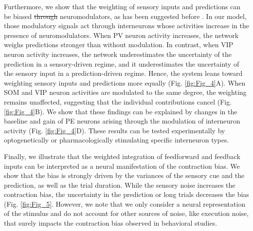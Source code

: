 \documentclass[10pt,a4paper]{article}
\providecommand{\DIFaddtex}[1]{{\protect\color{blue}\uwave{#1}}} %
\providecommand{\DIFdeltex}[1]{{\protect\color{red}\sout{#1}}}                      %
\providecommand{\DIFaddbegin}{} %
\providecommand{\DIFaddend}{} %
\providecommand{\DIFdelbegin}{} %
\providecommand{\DIFdelend}{} %
\providecommand{\DIFadd}[1]{\texorpdfstring{\DIFaddtex{#1}}{#1}} %
\providecommand{\DIFdel}[1]{\texorpdfstring{\DIFdeltex{#1}}{}} %
\newcommand{\DIFscaledelfig}{0.5}
\newlength{\DIFdelgraphicswidth} %
\newlength{\DIFdelgraphicsheight} %
\newcommand{\DIFaddincludegraphics}[2][]{{\color{blue}\fbox{\DIFOincludegraphics[#1]{#2}}}} %
\newcommand{\DIFdelincludegraphics}[2][]{%
\sbox{\DIFdelgraphicsbox}{\DIFOincludegraphics[#1]{#2}}%
\settoboxwidth{\DIFdelgraphicswidth}{\DIFdelgraphicsbox} %
\settoboxtotalheight{\DIFdelgraphicsheight}{\DIFdelgraphicsbox} %
\scalebox{\DIFscaledelfig}{%
\parbox[b]{\DIFdelgraphicswidth}{\usebox{\DIFdelgraphicsbox}\\[-\baselineskip] \rule{\DIFdelgraphicswidth}{0em}}\llap{\resizebox{\DIFdelgraphicswidth}{\DIFdelgraphicsheight}{%
\setlength{\unitlength}{\DIFdelgraphicswidth}%
\begin{picture}(1,1)%
\thicklines\linethickness{2pt} %
{\color[rgb]{1,0,0}\put(0,0){\framebox(1,1){}}}%
{\color[rgb]{1,0,0}\put(0,0){\line( 1,1){1}}}%
{\color[rgb]{1,0,0}\put(0,1){\line(1,-1){1}}}%
\end{picture}%
}\hspace*{3pt}}} %
} %
\DeclareRobustCommand{\DIFaddbegin}{\DIFOaddbegin \let\includegraphics\DIFaddincludegraphics} %
\DeclareRobustCommand{\DIFaddend}{\DIFOaddend \let\includegraphics\DIFOincludegraphics} %
\DeclareRobustCommand{\DIFdelbegin}{\DIFOdelbegin \let\includegraphics\DIFdelincludegraphics} %
\DeclareRobustCommand{\DIFdelend}{\DIFOaddend \let\includegraphics\DIFOincludegraphics} %
\begin{document}
Furthermore, we show that the weighting of sensory inputs and predictions can be biased \DIFdelbegin \DIFdel{through }\DIFdelend \DIFaddbegin \DIFadd{by }\DIFaddend neuromodulators, as has been suggested before \citep[see, e.g.,][]{yon2021precision}. In our model, those modulatory signals act through interneurons \citep{cardin2019functional} whose activities increase in the presence of neuromodulators. When PV neuron activity increases, the network weighs predictions stronger than without modulation. In contrast, when VIP neuron activity increases, the network underestimates the uncertainty of the prediction in a sensory-driven regime, and it underestimates the uncertainty of the sensory input in a prediction-driven regime. Hence, the system leans toward weighting sensory inputs and predictions more equally (Fig. \ref{fig:Fig_4}A). When SOM and VIP neuron activities are modulated to the same degree, the weighting remains unaffected, suggesting that the individual contributions cancel (Fig. \ref{fig:Fig_4}B). We show that these findings can be explained by changes in the baseline and gain of PE neurons arising through the modulation of interneuron activity (Fig. \ref{fig:Fig_4}D). These results can be tested experimentally by optogenetically or pharmacologically stimulating specific interneuron types.  

Finally, we illustrate that the weighted integration of feedforward and feedback inputs can be interpreted as a neural manifestation of the contraction bias. We show that the bias is strongly driven by the variances of the sensory cue and the prediction, as well as the trial duration. While the sensory noise increases the contraction bias, the uncertainty in the prediction or long trials decreases the bias (Fig. \ref{fig:Fig_5}\DIFaddbegin \DIFadd{)}\DIFaddend . However, we note that we only consider a neural representation of the stimulus and do not account for other sources of noise, like execution noise, that surely impacts the contraction bias observed in behavioral studies.
\end{document}
